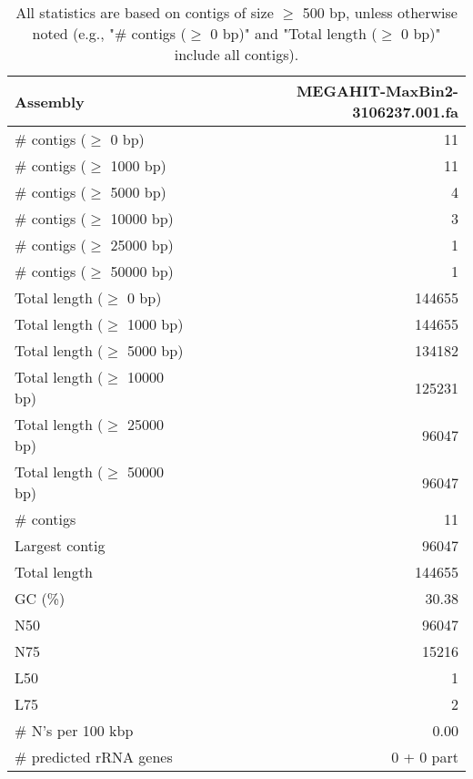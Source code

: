 \documentclass[12pt,a4paper]{article}
\begin{document}
\begin{table}[ht]
\begin{center}
\caption{All statistics are based on contigs of size $\geq$ 500 bp, unless otherwise noted (e.g., "\# contigs ($\geq$ 0 bp)" and "Total length ($\geq$ 0 bp)" include all contigs).}
\begin{tabular}{|l*{1}{|r}|}
\hline
Assembly & MEGAHIT-MaxBin2-3106237.001.fa \\ \hline
\# contigs ($\geq$ 0 bp) & 11 \\ \hline
\# contigs ($\geq$ 1000 bp) & 11 \\ \hline
\# contigs ($\geq$ 5000 bp) & 4 \\ \hline
\# contigs ($\geq$ 10000 bp) & 3 \\ \hline
\# contigs ($\geq$ 25000 bp) & 1 \\ \hline
\# contigs ($\geq$ 50000 bp) & 1 \\ \hline
Total length ($\geq$ 0 bp) & 144655 \\ \hline
Total length ($\geq$ 1000 bp) & 144655 \\ \hline
Total length ($\geq$ 5000 bp) & 134182 \\ \hline
Total length ($\geq$ 10000 bp) & 125231 \\ \hline
Total length ($\geq$ 25000 bp) & 96047 \\ \hline
Total length ($\geq$ 50000 bp) & 96047 \\ \hline
\# contigs & 11 \\ \hline
Largest contig & 96047 \\ \hline
Total length & 144655 \\ \hline
GC (\%) & 30.38 \\ \hline
N50 & 96047 \\ \hline
N75 & 15216 \\ \hline
L50 & 1 \\ \hline
L75 & 2 \\ \hline
\# N's per 100 kbp & 0.00 \\ \hline
\# predicted rRNA genes & 0 + 0 part \\ \hline
\end{tabular}
\end{center}
\end{table}
\end{document}
